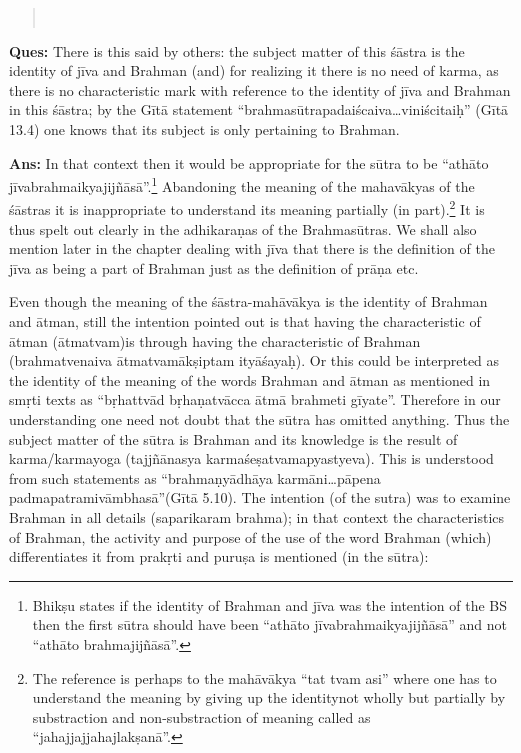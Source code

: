 \eject

\begin{verse}
\\
\end{verse}


\textbf{Ques:} There is this said by others: the subject matter of this śāstra is the identity of jīva and Brahman (and) for realizing it there is no need of karma, as there is no characteristic mark with reference to the identity of jīva and Brahman in this śāstra; by the Gītā statement “brahmasūtrapadaiścaiva…viniścitaiḥ” (Gītā 13.4)  one knows that its subject is only pertaining to Brahman.

\textbf{Ans:} In that context then it would be appropriate for the sūtra to be “athāto jīvabrahmaikyajijñāsā”.\footnote{Bhikṣu states if the identity of Brahman and jīva was the intention of the BS then the first sūtra should have been “athāto jīvabrahmaikyajijñāsā” and not “athāto brahmajijñāsā”.} Abandoning the meaning of the mahavākyas of the śāstras it is inappropriate to understand its meaning partially (in part).\footnote{The reference is perhaps to the mahāvākya “tat tvam asi” where one has to understand the meaning by giving up the identitynot wholly but partially by substraction and non-substraction of meaning called as “jahajjajjahajlakṣanā”.} It is thus spelt out clearly in the adhikaraṇas of the Brahmasūtras. We shall also mention later in the chapter dealing with jīva that there is the definition of the jīva as being a part of Brahman just as the definition of prāṇa etc.

Even though the meaning of the śāstra-mahāvākya is the identity of Brahman and ātman, still the intention pointed out is that having the  characteristic of ātman (ātmatvam)is through having the characteristic of Brahman (brahmatvenaiva ātmatvamākṣiptam ityāśayaḥ).  Or this could be interpreted as the identity of the meaning of the words Brahman and ātman as mentioned in smṛti texts as “bṛhattvād bṛhaṇat\-vācca ātmā brahmeti gīyate”. Therefore in our understanding one need not doubt that the sūtra has omitted anything. Thus the subject matter of the sūtra is Brahman and its knowledge is the result of karma/karma\-yoga (tajjñānasya karmaśeṣatvamapyastyeva). This is understood from such statements as “brahmaṇyādhāya karmāni…pāpena padmapatra\-mivāmbhasā”(Gītā 5.10). The intention (of the sutra) was to examine Brahman in all details (saparikaram brahma); in that context the characteristics of Brahman, the activity and purpose of the use of the word Brahman (which) differentiates it from prakṛti and puruṣa is mentioned (in the sūtra):

